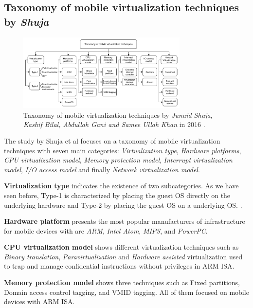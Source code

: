 	\subsection{Taxonomy of mobile virtualization techniques by \textit{Shuja}}
	
	\begin{figure}[H]
		\centering
		\includegraphics[width=8.5cm]{images/Shuja2016.pdf}
		\vspace{-0.2cm}
		\caption{Taxonomy of mobile virtualization techniques by \textit{Junaid Shuja, Kashif Bilal, Abdullah Gani and Samee Ullah Khan} in 2016 \cite{Shuja2016}.}
		\label{fig:TaxonomyByShuja}
	\end{figure}

	The study by Shuja et al \cite{Shuja2016} focuses on a taxonomy of mobile virtualization techniques with seven main categories: \textit{Virtualization type}, \textit{Hardware platforms}, \textit{CPU virtualization model}, \textit{Memory protection model}, \textit{Interrupt virtualization model}, \textit{I/O access model} and finally \textit{Network virtualization model}. 
	
	\textbf{Virtualization type} indicates the existence of two subcategories. As we have seen before, Type-1 is characterized by placing the guest OS directly on the underlying hardware and Type-2 by placing the guest OS on a underlying OS. \cite{Shuja2016, Zonghua2012}.
	
	\textbf{Hardware platform} presents the most popular manufacturers of infrastructure for mobile devices with are \textit{ARM}, \textit{Intel Atom}, \textit{MIPS}, and \textit{PowerPC}.
	
	\textbf{CPU virtualization model} shows different virtualization techniques such as \textit{Binary translation}, \textit{Paravirtualization} and \textit{Hardware assisted} virtualization used to trap and manage confidential instructions without privileges in ARM ISA. 
	
	\textbf{Memory protection model} shows three techniques such as Fixed partitions, Domain access control tagging, and VMID tagging. All of them focused on mobile devices with ARM ISA.

